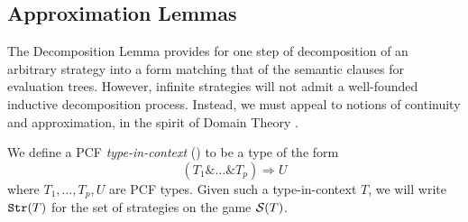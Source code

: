 \documentclass[11pt]{article}
\newcommand{\with}{\mbox{$\&$}}
\begin{document}
\subsection{Approximation Lemmas}
The Decomposition Lemma provides for one step of decomposition of an
arbitrary strategy into a form matching that of the semantic clauses
for evaluation trees. However, infinite strategies will not admit a
well-founded inductive decomposition process. Instead, we must appeal
to notions of continuity and approximation, in the spirit of Domain
Theory \cite{AbramskyS:domt}.

We define a PCF {\em type-in-context} (\cite{CroleRL:catt}) to be a type of
the form
$$(T_1\with\dots\with T_p)\Rightarrow U$$
where $T_1,\dots,T_p,U$ are PCF types. Given such a type-in-context
$T$, we will write ${\tt Str}(T)$ for the set of strategies on the game
${\cal S}( T)$.
\end{document}
